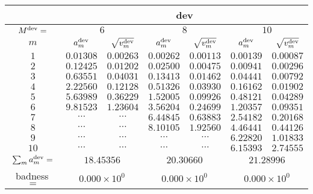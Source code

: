 \begin{tabular}{c|cc|cc|cc|}
&
\multicolumn{6}{|c|}{dev} \\
\hline
$M^{\mathrm{dev}}=$ &
 \multicolumn{2}{|c|}{$6$} &
 \multicolumn{2}{|c|}{$8$} &
 \multicolumn{2}{|c|}{$10$} \\
$m$ &
 $a^{\mathrm{dev}}_m$ & $\sqrt{v^{\mathrm{dev}}_m}$ &
 $a^{\mathrm{dev}}_m$ & $\sqrt{v^{\mathrm{dev}}_m}$ &
 $a^{\mathrm{dev}}_m$ & $\sqrt{v^{\mathrm{dev}}_m}$ \\
$1$ &
 $0.01308$ & $0.00263$ &
 $0.00262$ & $0.00113$ &
 $0.00139$ & $0.00087$ \\
$2$ &
 $0.12425$ & $0.01202$ &
 $0.02500$ & $0.00475$ &
 $0.00941$ & $0.00296$ \\
$3$ &
 $0.63551$ & $0.04031$ &
 $0.13413$ & $0.01462$ &
 $0.04441$ & $0.00792$ \\
$4$ &
 $2.22560$ & $0.12128$ &
 $0.51326$ & $0.03930$ &
 $0.16162$ & $0.01902$ \\
$5$ &
 $5.63989$ & $0.36229$ &
 $1.52005$ & $0.09926$ &
 $0.48121$ & $0.04289$ \\
$6$ &
 $9.81523$ & $1.23604$ &
 $3.56204$ & $0.24699$ &
 $1.20357$ & $0.09351$ \\
$7$ &
 $\cdots$ & $\cdots$ &
 $6.44845$ & $0.63883$ &
 $2.54182$ & $0.20168$ \\
$8$ &
 $\cdots$ & $\cdots$ &
 $8.10105$ & $1.92560$ &
 $4.46441$ & $0.44126$ \\
$9$ &
 $\cdots$ & $\cdots$ &
 $\cdots$ & $\cdots$ &
 $6.22820$ & $1.01833$ \\
$10$ &
 $\cdots$ & $\cdots$ &
 $\cdots$ & $\cdots$ &
 $6.15393$ & $2.74555$ \\
\hline
$\sum_m a^{\mathrm{dev}}_m=$ &
 \multicolumn{2}{|c|}{$18.45356$} &
 \multicolumn{2}{|c|}{$20.30660$} &
 \multicolumn{2}{|c|}{$21.28996$} \\
badness\,$=$ &
 \multicolumn{2}{|c|}{$0.000\times 10^{0}$} &
 \multicolumn{2}{|c|}{$0.000\times 10^{0}$} &
 \multicolumn{2}{|c|}{$0.000\times 10^{0}$} \\
\end{tabular}
